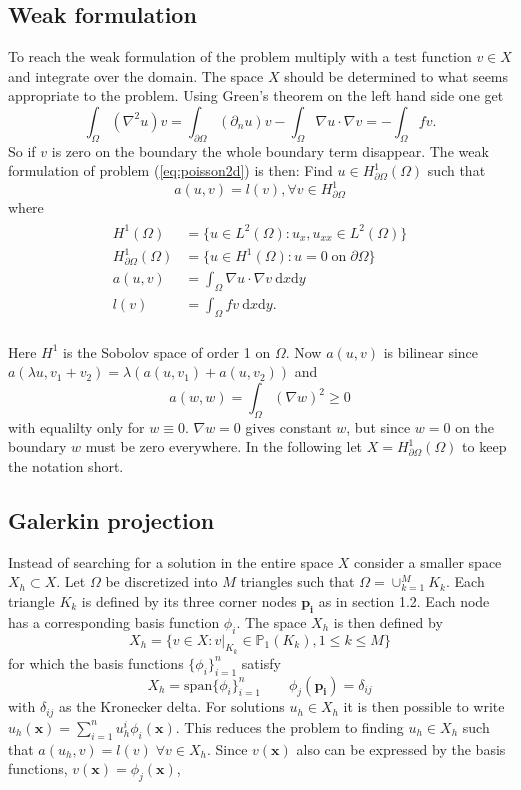 \documentclass[paper=a4, fontsize=11pt]{scrartcl} %
\begin{document}
\subsection{Weak formulation}
To reach the weak formulation of the problem multiply with a test function $v\in X$ and integrate over the domain. The space $X$ should be determined to what seems appropriate to the problem. Using Green's theorem on the left hand side one get 
\[\int_{\Omega}  (\nabla^2u)v = \int_{\partial\Omega} (\partial_n u) v -\int_{\Omega} \nabla u \cdot \nabla v = -\int_{\Omega} f v.\]
So if $v$ is zero on the boundary the whole boundary term disappear. The weak formulation of problem (\ref{eq:poisson2d}) is then: Find $u\in H^1_{\partial\Omega}(\Omega)$ such that
\[a(u,v) = l(v), \forall v \in H^1_{\partial\Omega}\]
where 
\begin{eqnarray}
\begin{aligned}
H^1(\Omega) &= \{u \in L^2(\Omega) : u_x, u_{xx} \in L^2(\Omega)\} \\
H^1_{\partial\Omega}(\Omega) &= \{u\in H^1(\Omega) : u=0 \; \mathrm{on} \;  \partial\Omega\} \\
a(u,v) &= \int_{\Omega} \nabla u\cdot\nabla v \: \mathrm{d}x\mathrm{d}y\\
l(v) &= \int_{\Omega} f v \: \mathrm{d}x\mathrm{d}y.\\
\end{aligned}
\label{eq:poisson2d:Weak}
\end{eqnarray}

Here $H^1$ is the Sobolov space of order 1 on $\Omega$. Now $a(u,v)$ is bilinear since $a(\lambda u,v_1+v_2)=\lambda\left(a(u,v_1)+a(u,v_2)\right)$ and
\[a(w,w)=\int_{\Omega} (\nabla w)^2 \geq 0\] 
with equalilty only for $w\equiv 0$. $\nabla w=0$ gives constant $w$, but since $w=0$ on the boundary $w$ must be zero everywhere. In the following let $X=H^1_{\partial\Omega}(\Omega)$ to keep the notation short.

\subsection{Galerkin projection}
Instead of searching for a solution in the entire space $X$ consider a smaller space $X_h \subset X$. Let $\Omega$ be discretized into $M$ triangles such that $\Omega = \cup^M_{k=1} K_k$. Each triangle $K_k$ is defined by its three corner nodes $\mathbf{p_i}$ as in section 1.2. Each node has a corresponding basis function $\phi_i$. The space $X_h$ is then defined by
\[ X_h = \{v \in X : v|_{K_k} \in \mathbb{P}_1(K_k),1\leq k\leq M\}\] 
for which the basis functions $\{\phi_i\}^n_{i=1}$ satisfy
\[ X_h = \mathrm{span}\{\phi_i\}^n_{i=1} \qquad \phi_j(\mathbf{p_i})=\delta_{ij}\]
with $\delta_{ij}$ as the Kronecker delta. For solutions $u_h\in X_h$ it is then possible to write $u_h(\mathbf{x})=\sum^n_{i=1} u^i_h\phi_i(\mathbf{x})$. This reduces the problem to finding $u_h \in X_h$ such that $a(u_h,v)=l(v) \; \forall v\in X_h$.
Since $v(\mathbf{x})$ also can be expressed by the basis functions, $v(\mathbf{x})=\phi_j(\mathbf{x})$,
\end{document}
